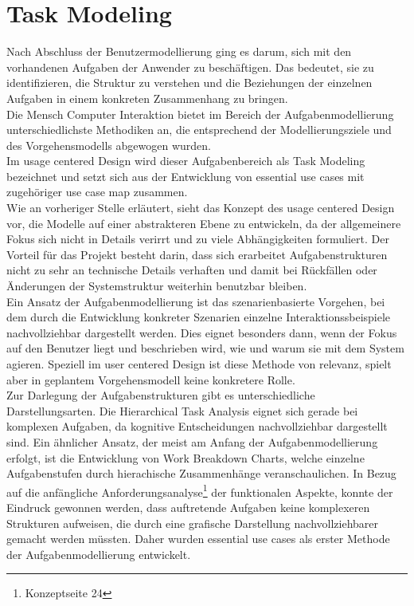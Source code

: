 
\section{Task Modeling}
Nach Abschluss der Benutzermodellierung ging es darum, sich mit den vorhandenen Aufgaben der Anwender zu beschäftigen. Das bedeutet, sie zu identifizieren, die Struktur zu verstehen und die Beziehungen der einzelnen Aufgaben in einem konkreten Zusammenhang zu bringen.\\

Die Mensch Computer Interaktion bietet im Bereich der Aufgabenmodellierung unterschiedlichste Methodiken an, die entsprechend der Modellierungsziele und des Vorgehensmodells abgewogen wurden.\\
Im usage centered Design wird dieser Aufgabenbereich als Task Modeling bezeichnet und setzt sich aus der Entwicklung von essential use cases mit zugehöriger use case map zusammen.\\
Wie an vorheriger Stelle erläutert, sieht das Konzept des usage centered Design vor, die Modelle auf einer abstrakteren Ebene zu entwickeln, da der allgemeinere Fokus sich nicht in Details verirrt und zu viele Abhängigkeiten formuliert. Der Vorteil für das Projekt besteht darin, dass sich erarbeitet Aufgabenstrukturen nicht zu sehr an technische Details verhaften und damit bei Rückfällen oder Änderungen der Systemstruktur weiterhin benutzbar bleiben. \\
Ein Ansatz der Aufgabenmodellierung ist das szenarienbasierte Vorgehen, bei dem durch die Entwicklung konkreter Szenarien einzelne Interaktionssbeispiele nachvollziehbar dargestellt werden. Dies eignet besonders dann, wenn der Fokus auf den Benutzer liegt und beschrieben wird, wie und warum sie mit dem System agieren. Speziell im user centered Design ist diese Methode von relevanz, spielt aber in geplantem Vorgehensmodell keine konkretere Rolle.\\

Zur Darlegung der Aufgabenstrukturen gibt es unterschiedliche Darstellungsarten. Die Hierarchical Task Analysis eignet sich gerade bei komplexen Aufgaben, da kognitive Entscheidungen nachvollziehbar dargestellt sind. Ein ähnlicher Ansatz, der meist am Anfang der Aufgabenmodellierung erfolgt, ist die Entwicklung von Work Breakdown Charts, welche einzelne Aufgabenstufen durch hierachische Zusammenhänge veranschaulichen. In Bezug auf die anfängliche Anforderungsanalyse\footnote{Konzeptseite 24} der funktionalen Aspekte, konnte der Eindruck gewonnen werden, dass auftretende Aufgaben keine komplexeren Strukturen aufweisen, die durch eine grafische Darstellung nachvollziehbarer gemacht werden müssten. Daher wurden essential use cases als erster Methode der Aufgabenmodellierung entwickelt.


